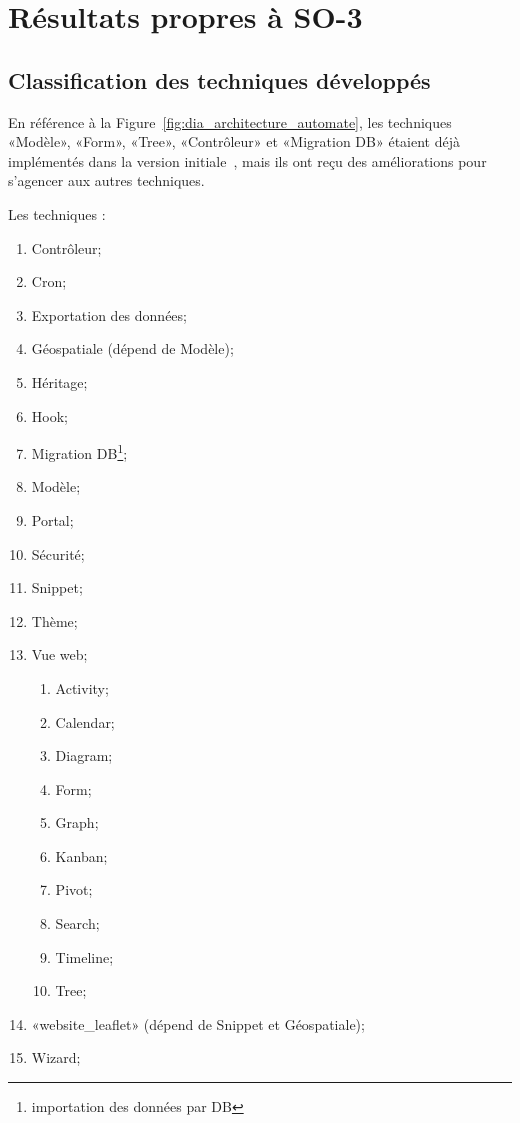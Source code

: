 \section{Résultats propres à SO-3}

\subsection{Classification des techniques développés}\label{result_technique_developpe}

En référence à la Figure~\ref{fig:dia_architecture_automate}, les techniques «Modèle», «Form», «Tree», «Contrôleur» et «Migration DB» étaient déjà implémentés dans la version initiale~\cite{bluiksnot_repo}, mais ils ont reçu des améliorations pour s’agencer aux autres techniques.

Les techniques :
\begin{enumerate}
    \item Contrôleur;
    \item Cron;
    \item Exportation des données;
    \item Géospatiale (dépend de Modèle);
    \item Héritage;
    \item Hook;
    \item Migration DB\footnote{importation des données par DB};
    \item Modèle;
    \item Portal;
    \item Sécurité;
    \item Snippet;
    \item Thème;
    \item Vue web;
    \begin{enumerate}
        \item Activity;
        \item Calendar;
        \item Diagram;
        \item Form;
        \item Graph;
        \item Kanban;
        \item Pivot;
        \item Search;
        \item Timeline;
        \item Tree;
    \end{enumerate}
    \item «website\_leaflet» (dépend de Snippet et Géospatiale);
    \item Wizard;
\end{enumerate}

